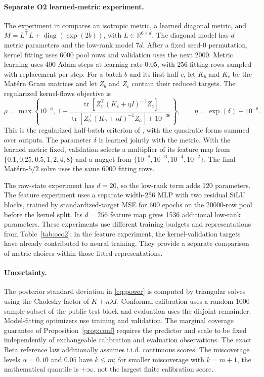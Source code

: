 \paragraph{Separate O2 learned-metric experiment.}\label{supp:oco-learned-metric}
The experiment in  compares an isotropic
metric, a learned diagonal metric, and
$M=L^\top L+\operatorname{diag}(\exp(2b))$, with $L\in\mathbb R^{6\times d}$.
The diagonal model has $d$ metric parameters and the low-rank model $7d$.
After a fixed seed-0 permutation, kernel fitting uses 6000 pool rows and
validation uses the next 2000. Metric learning uses 400 Adam steps at
learning rate $0.05$, with 256 fitting rows sampled with replacement per
step. For a batch $b$ and its first half $c$, let $K_b$ and $K_c$ be the
Mat\'ern Gram matrices and let $Z_b$ and $Z_c$ contain their reduced
targets. The regularized kernel-flows objective is
\[
 \rho=\max\left\{10^{-6},\,
 1-\frac{\operatorname{tr}\!\left[Z_c^\top(K_c+\eta I)^{-1}Z_c\right]}
 {\operatorname{tr}\!\left[Z_b^\top(K_b+\eta I)^{-1}Z_b\right]+10^{-30}}
 \right\},\qquad \eta=\exp(\delta)+10^{-8}.
\]
This is the regularized half-batch criterion of
\citet{owhadi2019kernel}, with the quadratic forms summed over outputs.
The parameter $\delta$ is learned jointly with the metric.
With the learned metric fixed, validation
selects a multiplier of its feature map from
$\{0.1,\allowbreak 0.25,\allowbreak 0.5,\allowbreak 1,\allowbreak 2,\allowbreak 4,\allowbreak 8\}$ and a nugget from
$\{10^{-8},10^{-6},10^{-4},10^{-2}\}$. The final Mat\'ern-$5/2$ solve uses
the same 6000 fitting rows.

The raw-state experiment has $d=20$, so the low-rank term adds 120
parameters. The feature experiment uses a separate width-256 MLP with two
residual SiLU blocks, trained by standardized-target MSE for 600 epochs
on the 20000-row pool before the kernel split. Its $d=256$ feature map gives
1536 additional low-rank parameters. These experiments use different
training budgets and representations from Table~\ref{tab:oco2}; in the
feature experiment, the kernel-validation targets have already contributed
to neural training. They provide a separate comparison of metric choices
within those fitted representations.

\paragraph{Uncertainty.} The posterior standard deviation in
\eqref{eq:power} is computed by triangular solves using the Cholesky
factor of $K+n\lambda I$.
Conformal calibration uses a random 1000-sample subset of the public test block and evaluation uses the disjoint remainder. Model-fitting optimizers use training and validation. The marginal coverage guarantee of Proposition~\ref{prop:conf} requires the predictor and scale to be fixed independently of exchangeable calibration and evaluation observations. The exact Beta reference law additionally assumes i.i.d. continuous scores. The miscoverage levels $\alpha=0.10$ and $0.05$ have $k\le m$; for smaller miscoverage with $k=m+1$, the mathematical quantile is $+\infty$, not the largest finite calibration score.
